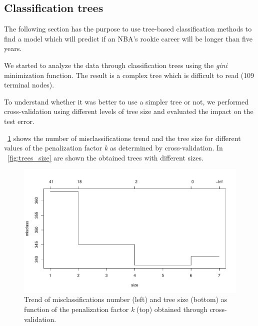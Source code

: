 \subsection{Classification trees}

The following section has the purpose to use tree-based classification methods to find a model which will predict if an NBA's rookie career will be longer than five years.

We started to analyze the data through classification trees using the \textit{gini} minimization function. The result is a complex tree which is difficult to read (109 terminal nodes).

To understand whether it was better to use a simpler tree or not, we performed cross-validation using different levels of tree size and evaluated the impact on the test error.

\Fig~\ref{fig:tree_cv_plot} shows the number of misclassifications trend and the tree size for different values of the penalization factor \textit{k} as determined by cross-validation. In \Fig~\ref{fig:trees_size} are shown the obtained trees with different sizes.

\begin{figure}[h]
	\centering
	\includegraphics[width=0.5\linewidth]{ImageFiles/Classification/Trees/tree_cv_plot.pdf}
	\caption{Trend of misclassifications number (left) and tree size (bottom) as function of the penalization factor \textit{k} (top) obtained through cross-validation.}
	\label{fig:tree_cv_plot}
\end{figure}

